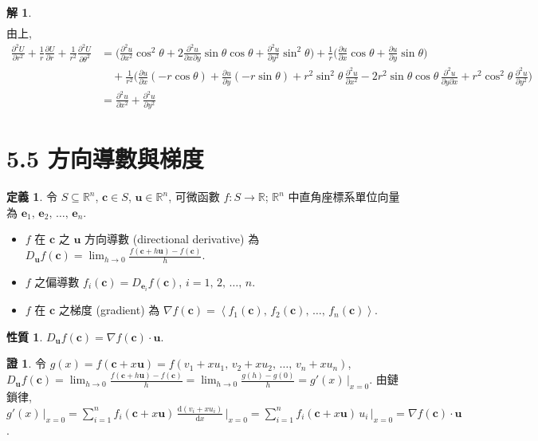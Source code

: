 \documentclass[12pt]{extarticle}
\newcommand{\ds}{\displaystyle}
\newcommand{\llt}{\left\langle}
\newcommand{\rgt}{\right\rangle}
\theoremstyle{definition}
\newtheorem*{dfn}{定義}
\newtheorem*{prp}{性質}
\newtheorem*{sol}{解}
\newtheorem*{prf}{證}
\newcommand{\vc}{\mathbf{c}}
\newcommand{\ve}{\mathbf{e}}
\newcommand{\vu}{\mathbf{u}}
\newcommand{\pdiff}[2]{\frac{\partial #1}{\partial #2}}
\newcommand{\pdifft}[2]{\frac{\partial^2 #1}{\partial #2^2}}
\newcommand{\diff}[2]{\frac{\mathrm{d} #1}{\mathrm{d} #2}}
\begin{document}
\begin{sol}
\begin{align*}
  \end{align*}
  由上,  
  \begin{align*}
    \pdifft{U}{r} + \frac{1}{r}\pdiff{U}{r} + \frac{1}{r^2}\pdifft{U}{\theta} &= \bigg(\pdifft{u}{x}\cos^2\theta + 2\frac{\partial^2 u}{\partial x\partial y}\sin\theta\cos\theta + \pdifft{u}{y}\sin^2\theta\bigg) + \frac{1}{r}\bigg(\pdiff{u}{x}\cos\theta + \pdiff{u}{y}\sin\theta\bigg) \\ &\quad+ \frac{1}{r^2}\bigg(\pdiff{u}{x}(-r\cos\theta) + \pdiff{u}{y}(-r\sin\theta) + r^2\sin^2\theta\,\pdifft{u}{x} -2r^2\sin\theta\cos\theta\,\frac{\partial^2 u}{\partial y\partial x} + r^2\cos^2\theta\,\pdifft{u}{y}\bigg) \\ &= \pdifft{u}{x}+ \pdifft{u}{y}
  \end{align*}
\end{sol}

\section*{5.5 方向導數與梯度}

\begin{dfn}
  令 $S\subseteq\mathbb{R}^n$, $\vc\in S$, $\vu\in\mathbb{R}^n$, 可微函數 $\ds f:S\to\mathbb{R}$; $\mathbb{R}^n$ 中直角座標系單位向量為 $\ve_1,\,\ve_2,\,\ldots,\,\ve_n$. 
  \begin{itemize}\setlength{\itemsep}{0pt}
    \item $f$ 在 $\vc$ 之 $\ds\vu$ 方向導數 (directional derivative) 為 $\ds D_{\vu}f(\vc) = \lim_{h\to 0}\frac{f(\vc + h\vu) - f(\vc)}{h}$. 
    \item $f$ 之偏導數 $\ds f_i(\vc) = D_{\ve_i}f(\vc)$, $i = 1,\,2,\,\ldots,\,n$. 
    \item $f$ 在 $\vc$ 之梯度 (gradient) 為 $\ds\nabla f(\vc) = \llt f_1(\vc),\,f_2(\vc),\,\ldots,\,f_n(\vc)\rgt$. 
  \end{itemize}
\end{dfn}

\begin{prp}
  $\ds D_{\vu}f(\vc) = \nabla f(\vc)\cdot\vu$.  
\end{prp}

\begin{prf}
  令 $\ds g(x) = f(\vc + x\vu) = f(v_1 + x u_1,\,v_2 + x u_2,\,\ldots,\,v_n + x u_n)$, $\ds D_{\vu}f(\vc) = \lim_{h\to 0}\frac{f(\vc + h\vu) - f(\vc)}{h} = \lim_{h\to 0}\frac{g(h) - g(0)}{h} = g'(x)\,\big|_{x = 0}$. 由鏈鎖律, $\ds g'(x)\,\big|_{x = 0} = \sum_{i = 1}^n f_i(\vc + x\vu)\,\diff{(v_i + x u_i)}{x}\,\bigg|_{x = 0} = \sum_{i = 1}^n f_i(\vc + x\vu)\,u_i\,\bigg|_{x = 0} = \nabla f(\vc)\cdot\vu$. 
\end{prf}
\end{document}
